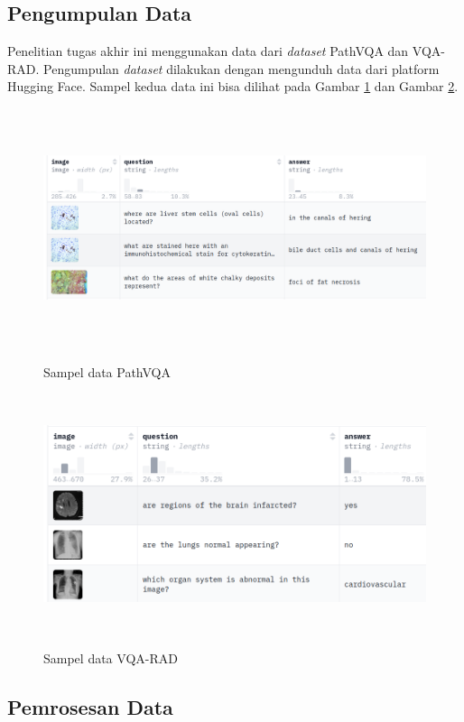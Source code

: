 \subsection{Pengumpulan Data}

\par Penelitian tugas akhir ini menggunakan data dari \textit{\textit{dataset}} PathVQA dan VQA-RAD. Pengumpulan \textit{\textit{dataset}} dilakukan dengan mengunduh data dari platform Hugging Face. Sampel kedua data ini bisa dilihat pada Gambar \ref{data_pathvqa} dan Gambar \ref{data_vqa-rad}.

\begin{figure}[H]
    \centering
    {\includegraphics[width=\textwidth, height = 7cm]{image/bab3/pathvqa-sample.png}}
    \caption{Sampel data PathVQA}
    \label{data_pathvqa}
\end{figure}


\begin{figure}[H]
    \centering
    {\includegraphics[width=\textwidth, height = 7cm]{image/bab3/vqarad-sample.png}}
    \caption{Sampel data VQA-RAD}
    \label{data_vqa-rad}
\end{figure}


\subsection{Pemrosesan Data}

